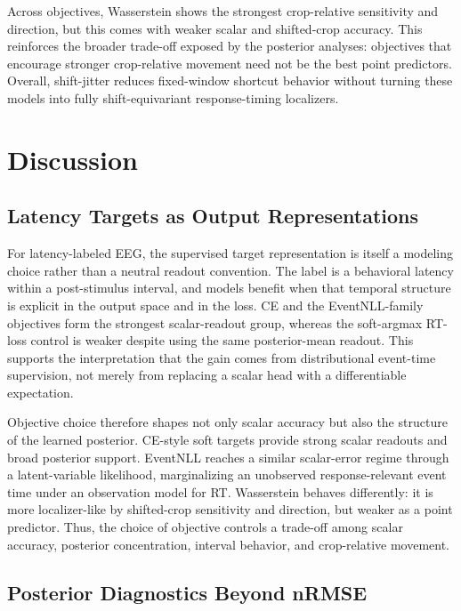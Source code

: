 \documentclass[12pt]{article}
\begin{document}
Across objectives, Wasserstein shows the strongest crop-relative sensitivity and direction, but this comes with weaker scalar and shifted-crop accuracy. This reinforces the broader trade-off exposed by the posterior analyses: objectives that encourage stronger crop-relative movement need not be the best point predictors. Overall, shift-jitter reduces fixed-window shortcut behavior without turning these models into fully shift-equivariant response-timing localizers.

\FloatBarrier

\section{Discussion}

\subsection{Latency Targets as Output Representations}

For latency-labeled EEG, the supervised target representation is itself a modeling choice rather than a neutral readout convention. The label is a behavioral latency within a post-stimulus interval, and models benefit when that temporal structure is explicit in the output space and in the loss. CE and the EventNLL-family objectives form the strongest scalar-readout group, whereas the soft-argmax RT-loss control is weaker despite using the same posterior-mean readout. This supports the interpretation that the gain comes from distributional event-time supervision, not merely from replacing a scalar head with a differentiable expectation.

Objective choice therefore shapes not only scalar accuracy but also the structure of the learned posterior. CE-style soft targets provide strong scalar readouts and broad posterior support. EventNLL reaches a similar scalar-error regime through a latent-variable likelihood, marginalizing an unobserved response-relevant event time under an observation model for RT. Wasserstein behaves differently: it is more localizer-like by shifted-crop sensitivity and direction, but weaker as a point predictor. Thus, the choice of objective controls a trade-off among scalar accuracy, posterior concentration, interval behavior, and crop-relative movement.

\subsection{Posterior Diagnostics Beyond nRMSE}
\end{document}
